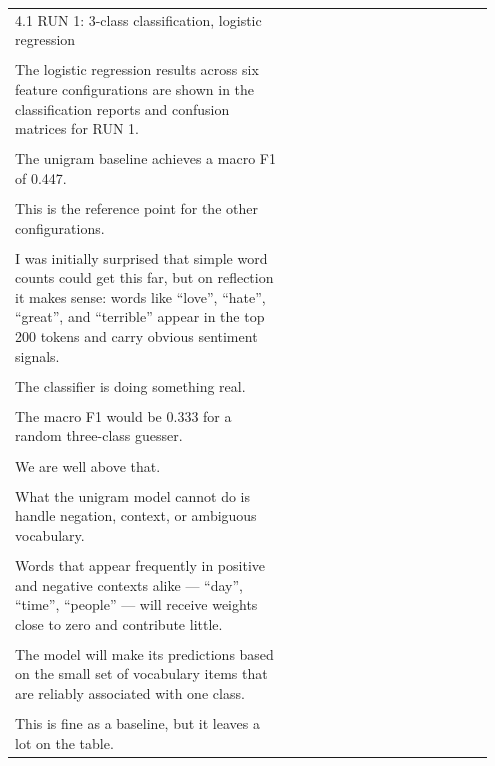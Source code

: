 \documentclass[11pt]{article}
\begin{document}
\begin{longtable}{|p{0.55\linewidth}|p{0.40\linewidth}|}
\hline
\rule{0pt}{3.5cm} & \\
\hline
4.1 RUN 1: 3-class classification, logistic regression & \\[2pt]
\hline
\rule{0pt}{3.5cm} & \\
\hline
The logistic regression results across six feature configurations are shown in the classification reports and confusion matrices for RUN 1. & \\[2pt]
\hline
\rule{0pt}{3.5cm} & \\
\hline
The unigram baseline achieves a macro F1 of 0.447. & \\[2pt]
\hline
\rule{0pt}{3.5cm} & \\
\hline
This is the reference point for the other configurations. & \\[2pt]
\hline
\rule{0pt}{3.5cm} & \\
\hline
I was initially surprised that simple word counts could get this far, but on reflection it makes sense: words like ``love'', ``hate'', ``great'', and ``terrible'' appear in the top 200 tokens and carry obvious sentiment signals. & \\[2pt]
\hline
\rule{0pt}{3.5cm} & \\
\hline
The classifier is doing something real. & \\[2pt]
\hline
\rule{0pt}{3.5cm} & \\
\hline
The macro F1 would be 0.333 for a random three-class guesser. & \\[2pt]
\hline
\rule{0pt}{3.5cm} & \\
\hline
We are well above that. & \\[2pt]
\hline
\rule{0pt}{3.5cm} & \\
\hline
What the unigram model cannot do is handle negation, context, or ambiguous vocabulary. & \\[2pt]
\hline
\rule{0pt}{3.5cm} & \\
\hline
Words that appear frequently in positive and negative contexts alike --- ``day'', ``time'', ``people'' --- will receive weights close to zero and contribute little. & \\[2pt]
\hline
\rule{0pt}{3.5cm} & \\
\hline
The model will make its predictions based on the small set of vocabulary items that are reliably associated with one class. & \\[2pt]
\hline
\rule{0pt}{3.5cm} & \\
\hline
This is fine as a baseline, but it leaves a lot on the table. & \\[2pt]

\end{longtable}
\end{document}
